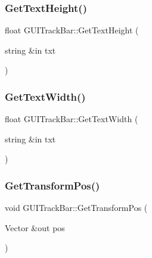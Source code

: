 \hypertarget{class_g_u_i_track_bar_a744300481a26f0bb1fb9874ae6ede72a}{}\label{class_g_u_i_track_bar_a744300481a26f0bb1fb9874ae6ede72a} 
\subsubsection{\texorpdfstring{Get\+Text\+Height()}{GetTextHeight()}}
{\footnotesize\ttfamily float G\+U\+I\+Track\+Bar\+::\+Get\+Text\+Height (\begin{DoxyParamCaption}\item[{string \&in}]{txt }\end{DoxyParamCaption})}

\hypertarget{class_g_u_i_track_bar_ac0ed210a9e6402e04bd7b02ec9d8cd56}{}\label{class_g_u_i_track_bar_ac0ed210a9e6402e04bd7b02ec9d8cd56} 
\subsubsection{\texorpdfstring{Get\+Text\+Width()}{GetTextWidth()}}
{\footnotesize\ttfamily float G\+U\+I\+Track\+Bar\+::\+Get\+Text\+Width (\begin{DoxyParamCaption}\item[{string \&in}]{txt }\end{DoxyParamCaption})}

\hypertarget{class_g_u_i_track_bar_a25d94c2f66c2fee602537935c5132108}{}\label{class_g_u_i_track_bar_a25d94c2f66c2fee602537935c5132108} 
\subsubsection{\texorpdfstring{Get\+Transform\+Pos()}{GetTransformPos()}}
{\footnotesize\ttfamily void G\+U\+I\+Track\+Bar\+::\+Get\+Transform\+Pos (\begin{DoxyParamCaption}\item[{Vector \&out}]{pos }\end{DoxyParamCaption})}

\hypertarget{class_g_u_i_track_bar_a761ae0357671e8e80cf353c803487b2b}{}\label{class_g_u_i_track_bar_a761ae0357671e8e80cf353c803487b2b} 
